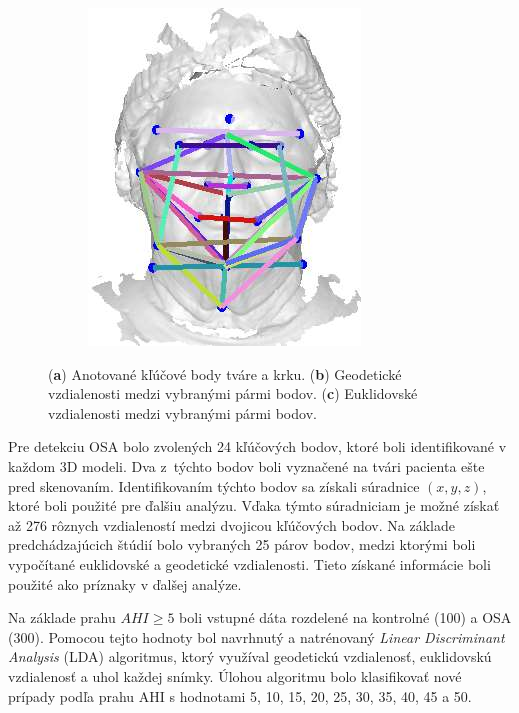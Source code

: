 \begin{figure}[h]
\begin{subfigure}[b]{0.21\textwidth}
		\includegraphics[width=\textwidth]{figures/resers_k.png}
		\caption{}
		\label{fig:resers:k}
	\end{subfigure}
	\caption{(\textbf{a}) Anotované kľúčové body tváre a krku. 
		(\textbf{b}) Geodetické vzdialenosti medzi vybranými pármi bodov.
		(\textbf{c}) Euklidovské vzdialenosti medzi vybranými pármi bodov. }
	\label{fig:resers:4}
\end{figure}

Pre detekciu OSA bolo zvolených 24 kľúčových bodov, ktoré boli identifikované v každom 3D modeli. 
Dva z týchto bodov boli vyznačené na tvári pacienta ešte pred skenovaním. Identifikovaním týchto bodov sa získali súradnice $(x,y,z)$, ktoré boli použité pre ďalšiu analýzu. Vďaka týmto súradniciam je možné získať až 276 rôznych vzdialeností medzi dvojicou kľúčových bodov.  Na základe predchádzajúcich štúdií bolo vybraných 25 párov bodov, medzi ktorými boli vypočítané euklidovské a geodetické vzdialenosti. Tieto získané informácie boli použité ako príznaky v ďalšej analýze. 

Na základe prahu $AHI\geq5$ boli vstupné dáta rozdelené na kontrolné (100) a OSA (300). Pomocou tejto hodnoty bol navrhnutý a natrénovaný \textit{Linear Discriminant Analysis} (LDA) algoritmus, ktorý využíval geodetickú vzdialenosť, euklidovskú vzdialenosť a uhol každej snímky. Úlohou algoritmu bolo klasifikovať nové prípady podľa prahu AHI s hodnotami 5, 10, 15, 20, 25, 30, 35, 40, 45 a 50.


